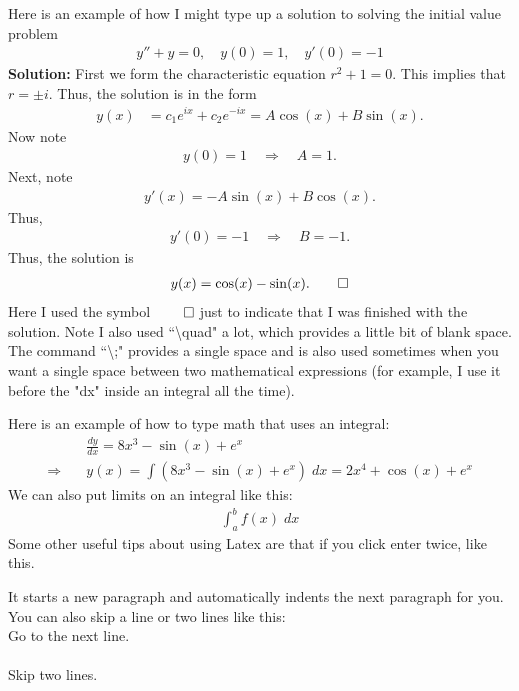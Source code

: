 \documentclass{article}
\begin{document}
Here is an example of how I might type up a solution to solving the initial value problem
\begin{align*}
    y'' + y = 0, \quad y(0) = 1, \quad y'(0) = -1
\end{align*}
\textbf{Solution:} \quad First we form the characteristic equation $r^2 + 1 = 0$. This implies that $r = \pm i$. Thus, the solution is in the form
\begin{align*}
    y(x) &= c_1 e^{ix} + c_2e^{-ix} = A \cos(x) + B \sin(x).
\end{align*}
Now note
\begin{align*}
    y(0) = 1 \quad \Rightarrow \quad A = 1.
\end{align*}
Next, note
\begin{align*}
    y'(x) = -A \sin(x) + B \cos(x).
\end{align*}
Thus, 
\begin{align*}
    y'(0) = -1 \quad \Rightarrow \quad B = -1.
\end{align*}
Thus, the solution is
\begin{align*}
    y(x) = \cos(x) - \sin(x). \qed
\end{align*} 
Here I used the symbol $\qed$ \quad just to indicate that I was finished with the solution. Note I also used ``\textbackslash quad" a lot, which provides a little bit of blank space. The command ``\textbackslash ;" provides a single space and is also used sometimes when you want a single space between two mathematical expressions (for example, I use it before the "dx" inside an integral all the time).

Here is an example of how to type math that uses an integral:
\begin{align*}
    & \frac{dy}{dx} = 8x^3 - \sin(x) + e^x \\
    \Rightarrow \quad & y(x) = \int \left(8x^3 - \sin(x) + e^x\right) \; dx = 2x^4 + \cos(x) + e^x
\end{align*}
We can also put limits on an integral like this:
\begin{align*}
    \int_a^b f(x) \; dx
\end{align*}
Some other useful tips about using Latex are that if you click enter twice, like this.

It starts a new paragraph and automatically indents the next paragraph for you. You can also skip a line or two lines like this: \\ 
Go to the next line. \\ \\
Skip two lines. \\ \\
\end{document}
